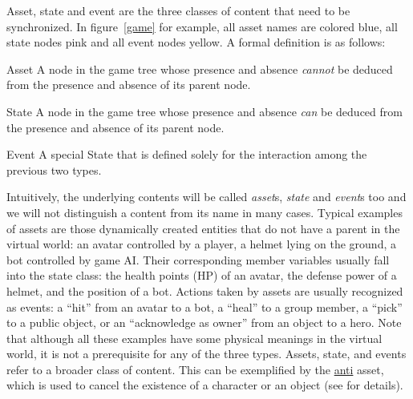 \documentclass{sigchi}
\begin{document}
Asset, state and event are the three classes of content that need to be synchronized. In figure~\ref{game} for example, all asset names are colored blue, all state nodes pink and all event nodes yellow. A formal definition is as follows:
\begin{description*} 
\item [Asset]
A node in the game tree whose presence and absence \emph{cannot} be deduced from the presence and absence of its parent node.
\item [State]
A node in the game tree whose presence and absence \emph{can} be deduced from the presence and absence of its parent node.
\item [Event]
A special State that is defined solely for the interaction among the previous two types.
\end{description*}
Intuitively, the underlying contents will be called \emph{asset}s, \emph{state} and \emph{event}s too and we will not distinguish a content from its name in many cases. Typical examples of assets are those dynamically created entities that do not have a parent in the virtual world: an avatar controlled by a player, a helmet lying on the ground, a bot controlled by game AI. Their corresponding member variables usually fall into the state class: the health points (HP) of an avatar, the defense power of a helmet, and the position of a bot. Actions taken by assets are usually recognized as events: a ``hit'' from an avatar to a bot, a ``heal'' to a group member, a ``pick'' to a public object, or an ``acknowledge as owner'' from an object to a hero. Note that although all these examples have some physical meanings in the virtual world, it is not a prerequisite for any of the three types. Assets, state, and events refer to a broader class of content. This can be exemplified by the \url{anti} asset, which is used to cancel the existence of a character or an object (see  for details).
\end{document}
